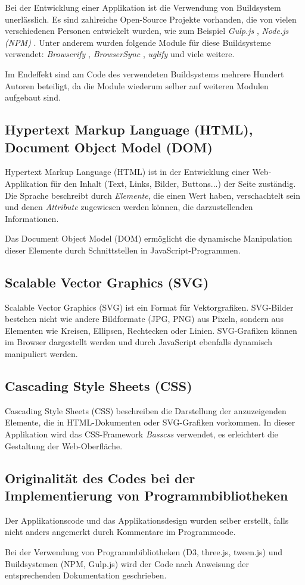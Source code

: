 Bei der Entwicklung einer Applikation ist die Verwendung von Buildsystem unerlässlich. Es sind zahlreiche Open-Source Projekte vorhanden, die von vielen verschiedenen Personen entwickelt wurden, wie zum Beispiel \textit{Gulp.js} \cite{gulp.js}, \textit{Node.js (NPM)} \cite{npm}. Unter anderem wurden folgende Module für diese Buildsysteme verwendet: \textit{Browserify} \cite{browserify},  \textit{BrowserSync} \cite{browsersync}, \textit{uglify} \cite{uglify} und viele weitere.

Im Endeffekt sind am Code des verwendeten Buildsystems mehrere Hundert Autoren beteiligt, da die Module wiederum selber auf weiteren Modulen aufgebaut sind.

\subsection{Hypertext Markup Language (HTML), Document Object Model (DOM)} \label{sec:dom}

Hypertext Markup Language (HTML) ist in der Entwicklung einer Web-Applikation für den Inhalt (Text, Links, Bilder, Buttons...) der Seite zuständig. Die Sprache beschreibt durch \textit{Elemente}, die einen Wert haben, verschachtelt sein und denen \textit{Attribute} zugewiesen werden können, die darzustellenden Informationen. 

Das Document Object Model (DOM) ermöglicht die dynamische Manipulation dieser Elemente durch Schnittstellen in JavaScript-Programmen.

\subsection{Scalable Vector Graphics (SVG)}

Scalable Vector Graphics (SVG) ist ein Format für Vektorgrafiken. SVG-Bilder bestehen nicht wie andere Bildformate (JPG, PNG) aus Pixeln, sondern aus Elementen wie Kreisen, Ellipsen, Rechtecken oder Linien. SVG-Grafiken können im Browser dargestellt werden und durch JavaScript ebenfalls dynamisch manipuliert werden.

\subsection{Cascading Style Sheets (CSS)}

Cascading Style Sheets (CSS) beschreiben die Darstellung der anzuzeigenden Elemente, die in HTML-Dokumenten oder SVG-Grafiken vorkommen. In dieser Applikation wird das CSS-Framework \textit{Basscss} \cite{basscss} verwendet, es erleichtert die Gestaltung der Web-Oberfläche.

\subsection{Originalität des Codes bei der Implementierung von Programmbibliotheken}

Der Applikationscode und das Applikationsdesign wurden selber erstellt, falls nicht anders angemerkt durch Kommentare im Programmcode.

Bei der Verwendung von Programmbibliotheken (D3, three.js, tween.js) und Buildsystemen (NPM, Gulp.js) wird der Code nach Anweisung der entsprechenden Dokumentation geschrieben.
